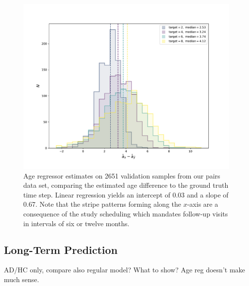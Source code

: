 \begin{figure}
	\centering
	\includegraphics[width=\linewidth]{images/age_plots/hist_fixed}
	\vspace*{-15pt}
	\caption{Age regressor estimates on 2651 validation samples from our pairs data set, comparing the estimated age difference to the ground truth time step. Linear regression yields an intercept of 0.03 and a slope of 0.67. Note that the stripe patterns forming along the $x$-axis are a consequence of the study scheduling which mandates follow-up visits in intervals of six or twelve months.}
	\label{fig:reghistfixed}
\end{figure}


\subsection{Long-Term Prediction}
AD/HC only, compare
also regular model? What to show? Age reg doesn't make much sense.



